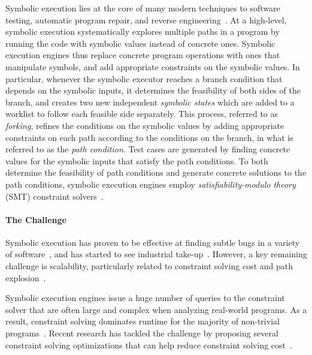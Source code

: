 
Symbolic execution lies at the core of many modern techniques to
software testing, automatic program repair, and reverse
engineering~\cite{dart,cute,klee,semfix,chipounov2010reverse,JPF-SE}. At
a high-level, symbolic execution systematically explores multiple
paths in a program by running the code with symbolic values instead of
concrete ones. Symbolic execution engines thus replace concrete
program operations with ones that manipulate symbols, and add
appropriate constraints on the symbolic values. In particular,
whenever the symbolic executor reaches a branch condition that depends
on the symbolic inputs, it determines the feasibility of both sides of
the branch, and creates two new independent \emph{symbolic states}
which are added to a worklist to follow each feasible side
separately. This process, referred to as \emph{forking}, refines the
conditions on the symbolic values by adding appropriate constraints on
each path according to the conditions on the branch, in what is
referred to as the \textit{path condition}.  Test cases are generated
by finding concrete values for the symbolic inputs that satisfy the
path conditions.  To both determine the feasibility of path conditions
and generate concrete solutions to the path conditions, symbolic
execution engines employ \emph{satisfiability-modulo theory} (SMT)
constraint solvers~\cite{smt:cacm11}.

\paragraph{The Challenge}
Symbolic execution has proven to be effective at finding subtle bugs
in a variety of software~\cite{klee,exe,JPF-SE,pex,sage}, and has
started to see industrial
take-up~\cite{symex-impact-11,sage,mayhem12}. However, a key remaining
challenge is scalability, particularly related to constraint solving
cost and path explosion~\cite{symex:cacm}.

Symbolic execution engines issue a huge number of queries to the
constraint solver that are often large and complex when analyzing
real-world programs. As a result, constraint solving dominates runtime
for the majority of non-trivial
programs~\cite{klee-multisolver,incremental-smt:hvc14}. Recent
research has tackled the challenge by proposing several constraint
solving optimizations that can help reduce constraint solving
cost~\cite{exe,cute,constraint-opt:cstva11,memoized:symex,
  green,greentrie,recal,klee-multisolver,klee-array}.

